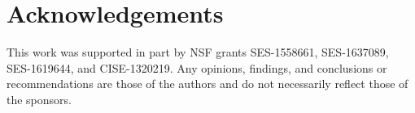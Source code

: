 \documentclass{llncs}
\begin{document}
\section{Acknowledgements}

This work was supported in part by NSF grants SES-1558661, SES-1637089, SES-1619644, and CISE-1320219. Any opinions, findings, and conclusions or recommendations are those of the authors and do not necessarily reflect those of the sponsors.


%
%



%
%
\end{document}
